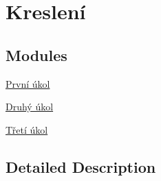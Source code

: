 \hypertarget{group__draw}{\section{Kreslení}
\label{group__draw}
}
\subsection*{Modules}
\begin{DoxyCompactItemize}
\item 
\hyperlink{group__task1}{První úkol}
\item 
\hyperlink{group__task2}{Druhý úkol}
\item 
\hyperlink{group__task3}{Třetí úkol}
\end{DoxyCompactItemize}


\subsection{Detailed Description}
